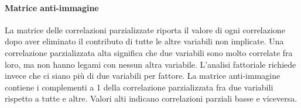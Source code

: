 \paragraph{Matrice anti-immagine}

La matrice delle correlazioni parzializzate riporta il valore di ogni correlazione dopo aver eliminato il contributo di tutte le altre variabili non implicate. Una correlazione
 parzializzata alta significa che due variabili sono molto
correlate fra loro, ma non hanno legami con nessun altra variabile.
L'analisi fattoriale richiede invece che ci siano più di due variabili per fattore. 
La matrice anti-immagine contiene i complementi a 1 della correlazione parzializzata fra due variabili rispetto a tutte e altre. Valori alti indicano correlazioni parziali basse e viceversa. 








